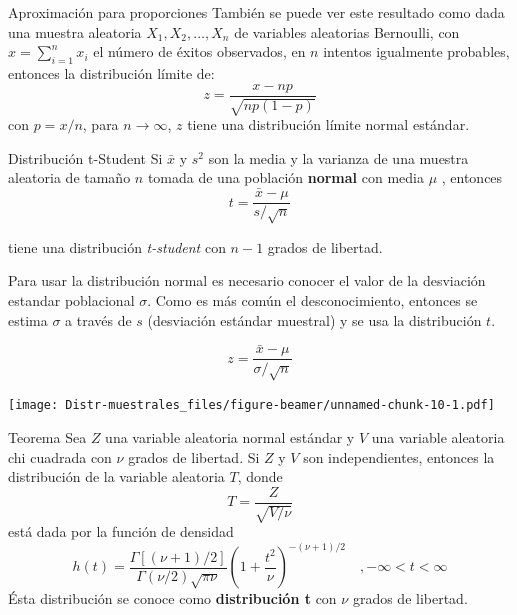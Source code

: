 \documentclass[
  10pt,
  ignorenonframetext,
]{beamer}
\begin{document}
\begin{frame}{}
\protect\hypertarget{section-26}{}
\begin{block}{Aproximación para proporciones}
\protect\hypertarget{aproximaciuxf3n-para-proporciones}{}
También se puede ver este resultado como dada una muestra aleatoria
\(X_1, X_2, \ldots, X_n\) de variables aleatorias Bernoulli, con
\(x =\sum_{i=1}^n x_i\) el número de éxitos observados, en \(n\)
intentos igualmente probables, entonces la distribución límite de:
\[z=\frac{x-np}{\sqrt{n p (1-p)}}\] con \(p=x/n\), para
\(n \to \infty\), \(z\) tiene una distribución límite normal estándar.
\end{block}
\end{frame}

\begin{frame}{Distribución t-Student}
\protect\hypertarget{distribuciuxf3n-t-student}{}
Si \(\bar{x}\) y \(s^2\) son la media y la varianza de una muestra
aleatoria de tamaño \(n\) tomada de una población \textbf{normal} con
media \(\mu\) , entonces \[t=\frac{\bar{x}-\mu}{s/\sqrt{n}}\]

tiene una distribución \emph{t-student} con \(n-1\) grados de libertad.

Para usar la distribución normal es necesario conocer el valor de la
desviación estandar poblacional \(\sigma\). Como es más común el
desconocimiento, entonces se estima \(\sigma\) a través de \(s\)
(desviación estándar muestral) y se usa la distribución \(t\).

\[z=\frac{\bar{x}-\mu}{\sigma /\sqrt{n}}\]
\end{frame}

\begin{frame}{}
\protect\hypertarget{section-27}{}
\texttt{[image: Distr-muestrales\_files/figure-beamer/unnamed-chunk-10-1.pdf]}
\end{frame}

\begin{frame}{}
\protect\hypertarget{section-28}{}
\begin{block}{Teorema}
\protect\hypertarget{teorema}{}
Sea \(Z\) una variable aleatoria normal estándar y \(V\) una variable
aleatoria chi cuadrada con \(\nu\) grados de libertad. Si \(Z\) y \(V\)
son independientes, entonces la distribución de la variable aleatoria
\(T\), donde \[T=\frac{Z}{\sqrt{V/\nu}}\] está dada por la función de
densidad
\[h(t)=\frac{\Gamma[(\nu+1)/2]}{\Gamma(\nu/2)\sqrt{\pi \nu}}\left(1+\frac{t^2}{\nu}\right)^{-(\nu +1)/2}\quad , -\infty <t<\infty\]
Ésta distribución se conoce como \textbf{distribución t} con \(\nu\)
grados de libertad.
\end{block}
\end{frame}
\end{document}
